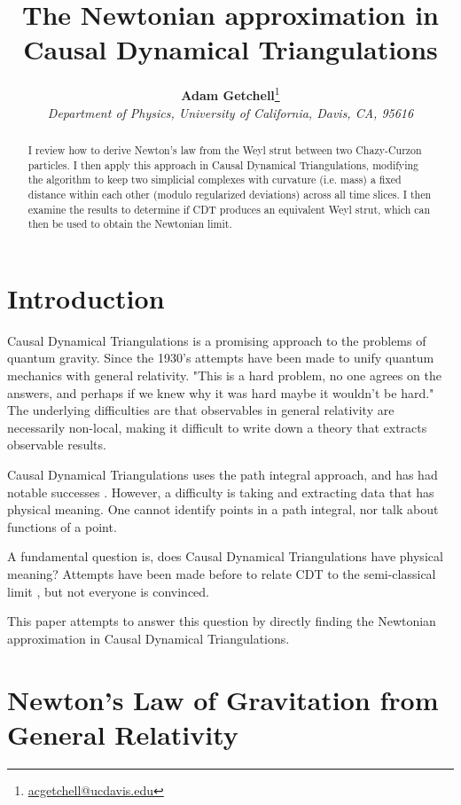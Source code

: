 \documentclass[12pt]{article}
\title{The Newtonian approximation in Causal Dynamical Triangulations}
\author{\textbf{Adam Getchell}\footnote{\href{mailto:acgetchell@ucdavis.edu}{acgetchell@ucdavis.edu}}\\\textit{Department of Physics, University of California, Davis, CA, 95616}}
\begin{document}
\maketitle

\begin{abstract}
I review how to derive Newton's law from the Weyl strut between two Chazy-Curzon particles. I then apply this approach in Causal Dynamical Triangulations, modifying the algorithm to keep two simplicial complexes with curvature (i.e. mass) a fixed distance within each other (modulo regularized deviations) across all time slices. I then examine the results to determine if CDT produces an equivalent Weyl strut, which can then be used to obtain the Newtonian limit.
\end{abstract}

\section{Introduction}

Causal Dynamical Triangulations \cite{cdt} is a promising approach to the problems of quantum gravity. Since the 1930's \cite{rovelli_notes_2000} attempts have been made to unify quantum mechanics with general relativity. "This is a hard problem, no one agrees on the answers, and perhaps if we knew why it was hard maybe it wouldn't be hard." The underlying difficulties are that observables in general relativity are necessarily non-local, making it difficult to write down a theory that extracts observable results.

Causal Dynamical Triangulations uses the path integral approach, and has had notable successes \cite{kommu_validation_2011}. However, a difficulty is taking and extracting data that has physical meaning. One cannot identify points in a path integral, nor talk about functions of a point.

A fundamental question is, does Causal Dynamical Triangulations have physical meaning? Attempts have been made before to relate CDT to the semi-classical limit \cite{ambjorn_semiclassical_2011,ambjorn_semiclassical}, but not everyone is convinced.

This paper attempts to answer this question by directly finding the Newtonian approximation in Causal Dynamical Triangulations.

\section{Newton's Law of Gravitation from General Relativity}
\label{sec:newtons-law}
\end{document}
